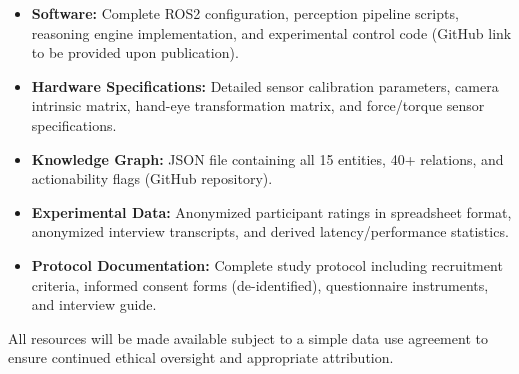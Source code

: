 \begin{itemize}
\item \textbf{Software:} Complete ROS2 configuration, perception pipeline scripts, reasoning engine implementation, and experimental control code (GitHub link to be provided upon publication).
\item \textbf{Hardware Specifications:} Detailed sensor calibration parameters, camera intrinsic matrix, hand-eye transformation matrix, and force/torque sensor specifications.
\item \textbf{Knowledge Graph:} JSON file containing all 15 entities, 40+ relations, and actionability flags (GitHub repository).
\item \textbf{Experimental Data:} Anonymized participant ratings in spreadsheet format, anonymized interview transcripts, and derived latency/performance statistics.
\item \textbf{Protocol Documentation:} Complete study protocol including recruitment criteria, informed consent forms (de-identified), questionnaire instruments, and interview guide.
\end{itemize}

All resources will be made available subject to a simple data use agreement to ensure continued ethical oversight and appropriate attribution.


